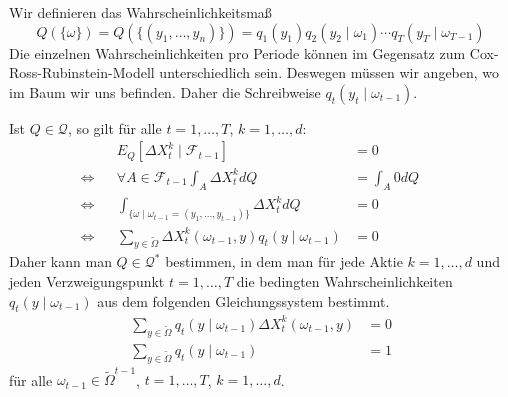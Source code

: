 \documentclass[a4paper,twoside,DIV15,BCOR12mm]{scrbook}
\newcommand{\cF}{\mathcal F}
\newcommand{\cQ}{\mathcal Q}
\begin{document}
Wir definieren das Wahrscheinlichkeitsmaß 
\[
Q(\{\omega\}) = Q(\{(y_1,\ldots,y_n)\}) = q_1(y_1) q_2(y_2\mid \omega_1) \cdots q_T(y_T\mid \omega_{T-1})
\]
Die einzelnen Wahrscheinlichkeiten pro Periode können im Gegensatz zum Cox-Ross-Rubinstein-Modell unterschiedlich sein. Deswegen müssen wir angeben, wo im Baum wir uns befinden. Daher die Schreibweise $q_t(y_t\mid \omega_{t-1})$. 

Ist $Q\in\cQ$, so gilt für alle $t=1,\ldots,T$, $k=1,\ldots,d$:
\begin{align*}
&& E_Q[\Delta X_t^k\mid \cF_{t-1}] &= 0 \\
\iff && \forall A \in \cF_{t-1} \int_A \Delta X_t^kdQ &= \int_A 0 dQ  && \\
\iff && \int_{\{\omega \mid \omega_{t-1} = (y_1,\ldots,y_{t-1})\}}
\Delta X_t^k dQ &= 0\\
\iff && \sum_{y\in\tilde\Omega} \Delta X_t^k(\omega_{t-1}, y) q_t(y\mid \omega_{t-1}) &= 0
\end{align*}
Daher kann man $Q\in \cQ^*$ bestimmen, in dem man für jede Aktie $k=1,\ldots,d$ und jeden Verzweigungspunkt $t=1,\ldots,T$ die bedingten Wahrscheinlichkeiten $q_t(y\mid \omega_{t-1})$ aus dem folgenden Gleichungssystem bestimmt.
\begin{align*}
\sum_{y\in\tilde\Omega} q_t(y\mid \omega_{t-1}) \Delta X_t^k (\omega_{t-1},y) &= 0 \\
\sum_{y\in\tilde\Omega} q_t(y \mid \omega_{t-1}) &= 1
\end{align*}
für alle $\omega_{t-1}\in \tilde\Omega^{t-1}$, $t=1,\ldots,T$, $k=1,\ldots,d$.
\end{document}
